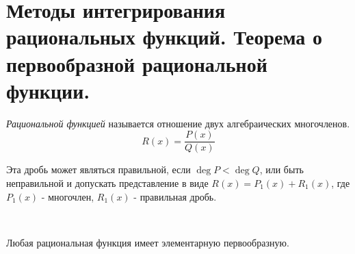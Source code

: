 \documentclass[../main.tex]{subfiles}
\begin{document}
\newpage
\section{Методы интегрирования рациональных функций. Теорема о первообразной рациональной функции.}
\emph{Рациональной функцией} называется отношение двух алгебраических многочленов. 
\[ R\left( x\right)= \dfrac{ P\left(x\right)}{ Q\left( x\right)}\]

Эта дробь может являться правильной, если \( \deg P < \deg Q\), или быть неправильной и допускать представление в виде \( R\left( x\right)=P_1\left( x\right)+R_1\left( x\right) \), где \( P_1\left( x\right)\) - многочлен, \( R_1\left( x\right)\) - правильная дробь.

\begin{thm}
    
    ~

    Любая рациональная функция имеет элементарную первообразную. 
\end{thm}
\end{document}
